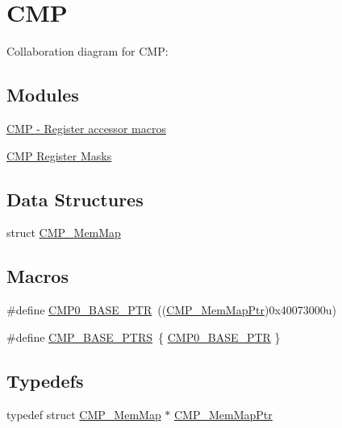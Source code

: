 \hypertarget{group___c_m_p___peripheral}{}\section{C\+MP}
\label{group___c_m_p___peripheral}
Collaboration diagram for C\+MP\+:
\subsection*{Modules}
\begin{DoxyCompactItemize}
\item 
\hyperlink{group___c_m_p___register___accessor___macros}{C\+M\+P -\/ Register accessor macros}
\item 
\hyperlink{group___c_m_p___register___masks}{C\+M\+P Register Masks}
\end{DoxyCompactItemize}
\subsection*{Data Structures}
\begin{DoxyCompactItemize}
\item 
struct \hyperlink{struct_c_m_p___mem_map}{C\+M\+P\+\_\+\+Mem\+Map}
\end{DoxyCompactItemize}
\subsection*{Macros}
\begin{DoxyCompactItemize}
\item 
\#define \hyperlink{group___c_m_p___peripheral_ga5a7a6b1d0743a05435ba5cb2dc2b3431}{C\+M\+P0\+\_\+\+B\+A\+S\+E\+\_\+\+P\+TR}~((\hyperlink{group___c_m_p___peripheral_ga6f5d370df3839e41b771c2d0b89cbb83}{C\+M\+P\+\_\+\+Mem\+Map\+Ptr})0x40073000u)
\item 
\#define \hyperlink{group___c_m_p___peripheral_gacc69654296499d45b2060956a3c8e97f}{C\+M\+P\+\_\+\+B\+A\+S\+E\+\_\+\+P\+T\+RS}~\{ \hyperlink{group___c_m_p___peripheral_ga5a7a6b1d0743a05435ba5cb2dc2b3431}{C\+M\+P0\+\_\+\+B\+A\+S\+E\+\_\+\+P\+TR} \}
\end{DoxyCompactItemize}
\subsection*{Typedefs}
\begin{DoxyCompactItemize}
\item 
typedef struct \hyperlink{struct_c_m_p___mem_map}{C\+M\+P\+\_\+\+Mem\+Map} $\ast$ \hyperlink{group___c_m_p___peripheral_ga6f5d370df3839e41b771c2d0b89cbb83}{C\+M\+P\+\_\+\+Mem\+Map\+Ptr}
\end{DoxyCompactItemize}


